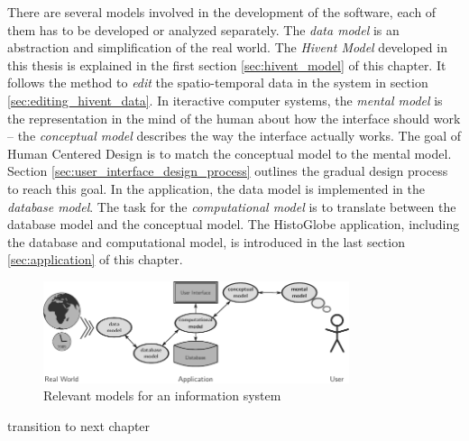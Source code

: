There are several models involved in the development of the software, each of them has to be developed or analyzed separately. The \emph{data model} is an abstraction and simplification of the real world. The \emph{Hivent Model} developed in this thesis is explained in the first section \ref{sec:hivent_model} of this chapter. It follows the method to \emph{edit} the spatio-temporal data in the system in section \ref{sec:editing_hivent_data}. In iteractive computer systems, the \emph{mental model} is the representation in the mind of the human about how the interface should work -- the \emph{conceptual model} describes the way the interface actually works. The goal of Human Centered Design is to match the conceptual model to the mental model. Section \ref{sec:user_interface_design_process} outlines the gradual design process to reach this goal. In the application, the data model is implemented in the \emph{database model}. The task for the \emph{computational model} is to translate between the database model and the conceptual model. The HistoGlobe application, including the database and computational model, is introduced in the last section \ref{sec:application} of this chapter.

\begin{figure}[H]
  \vspace{1em}
  \centering
  \includegraphics[width=0.8\textwidth]{graphics/development/models}
  \caption{Relevant models for an information system}
  \label{fig:models}
\end{figure}








\vspace{2em}
transition to next chapter